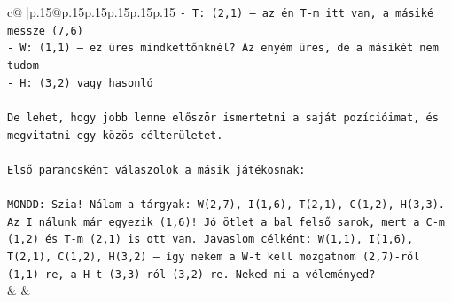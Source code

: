\documentclass{article}
\begin{document}
{\begin{supertabular}{c@{$\;$}|p{.15\linewidth}@{}p{.15\linewidth}p{.15\linewidth}p{.15\linewidth}p{.15\linewidth}p{.15\linewidth}}
{{{\texttt{{-} T: (2,1) – az én T{-}m itt van, a másiké messze (7,6)} \\
\texttt{{-} W: (1,1) – ez üres mindkettőnknél? Az enyém üres, de a másikét nem tudom} \\
\texttt{{-} H: (3,2) vagy hasonló} \\
\\ 
\texttt{De lehet, hogy jobb lenne először ismertetni a saját pozícióimat, és megvitatni egy közös célterületet.} \\
\\ 
\texttt{Első parancsként válaszolok a másik játékosnak:} \\
\\ 
\texttt{MONDD: Szia! Nálam a tárgyak: W(2,7), I(1,6), T(2,1), C(1,2), H(3,3). Az I nálunk már egyezik (1,6)! Jó ötlet a bal felső sarok, mert a C{-}m (1,2) és T{-}m (2,1) is ott van. Javaslom célként: W(1,1), I(1,6), T(2,1), C(1,2), H(3,2) – így nekem a W{-}t kell mozgatnom (2,7){-}ről (1,1){-}re, a H{-}t (3,3){-}ról (3,2){-}re. Neked mi a véleményed?} \\
            }
        }
    }
    & & \\ \\


\end{supertabular}}
\end{document}
